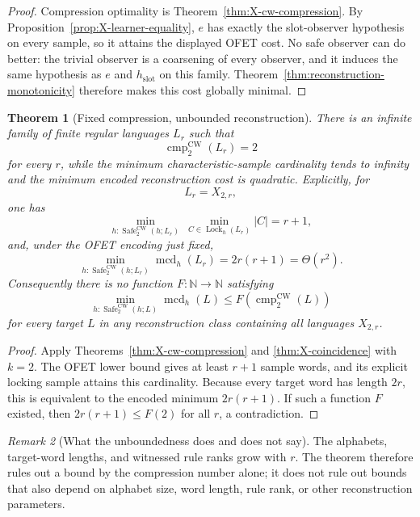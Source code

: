 \documentclass[11pt]{article}
\newtheorem{theorem}{Theorem}[section]
\theoremstyle{definition}
\theoremstyle{remark}
\newtheorem{remark}[theorem]{Remark}
\newcommand{\cmp}{\operatorname{cmp}}
\newcommand{\mcd}{\operatorname{mcd}}
\newcommand{\Lock}{\operatorname{Lock}}
\newcommand{\Safe}{\operatorname{Safe}}
\begin{document}
\begin{proof}
Compression optimality is Theorem~\ref{thm:X-cw-compression}.  By
Proposition~\ref{prop:X-learner-equality}, $e$ has exactly the slot-observer
hypothesis on every sample, so it attains the displayed OFET cost.  No safe
observer can do better: the trivial observer is a coarsening of every observer,
and it induces the same hypothesis as $e$ and $h_{\mathrm{slot}}$ on this
family.  Theorem~\ref{thm:reconstruction-monotonicity} therefore makes this
cost globally minimal.
\end{proof}

\begin{theorem}[Fixed compression, unbounded reconstruction]
\label{thm:fixed-compression-unbounded}
There is an infinite family of finite regular languages $L_r$ such that
\[
 \cmp_2^{\mathrm{CW}}(L_r)=2
\]
for every $r$, while the minimum characteristic-sample cardinality tends to
infinity and the minimum encoded reconstruction cost is quadratic.  Explicitly,
for
\[
 L_r=X_{2,r},
\]
one has
\[
 \boxed{
 \min_{h:\Safe_2^{\mathrm{CW}}(h;L_r)}
 \ \min_{C\in\Lock_h(L_r)} |C|
 =r+1,
 }
\]
and, under the OFET encoding just fixed,
\[
 \boxed{
 \min_{h:\Safe_2^{\mathrm{CW}}(h;L_r)}
 \mcd_h(L_r)
 =2r(r+1)=\Theta(r^2).
 }
\]
Consequently there is no function $F:\mathbb N\to\mathbb N$ satisfying
\[
 \min_{h:\Safe_2^{\mathrm{CW}}(h;L)}\mcd_h(L)
 \le F(\cmp_2^{\mathrm{CW}}(L))
\]
for every target $L$ in any reconstruction class containing all languages
$X_{2,r}$.
\end{theorem}

\begin{proof}
Apply Theorems~\ref{thm:X-cw-compression} and
\ref{thm:X-coincidence} with $k=2$.  The OFET lower bound gives at least
$r+1$ sample words, and its explicit locking sample attains this cardinality.
Because every target word has length $2r$, this is equivalent to the encoded
minimum $2r(r+1)$.  If such a function $F$ existed, then
$2r(r+1)\le F(2)$ for all $r$, a contradiction.
\end{proof}

\begin{remark}[What the unboundedness does and does not say]
The alphabets, target-word lengths, and witnessed rule ranks grow with $r$.
The theorem therefore rules out a bound by the compression number alone; it
does not rule out bounds that also depend on alphabet size, word length, rule
rank, or other reconstruction parameters.
\end{remark}
\end{document}
